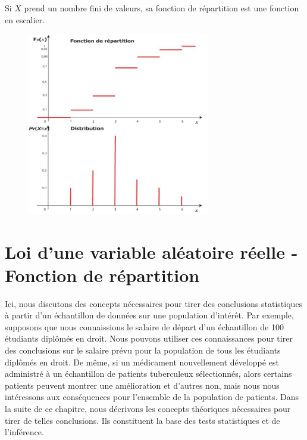 \begin{remark}
Si $X$ prend un nombre fini de
valeurs, sa fonction de répartition
est une fonction en escalier.
\begin{figure}[h]
\centering
\includegraphics[width=8cm]{content/figureremarque1.PNG}
\end{figure}
\end{remark}






































\iffalse
\section{Loi d’une variable aléatoire réelle - Fonction de répartition}\label{chap:1}

Ici, nous discutons des concepts nécessaires pour tirer des conclusions statistiques à partir d'un échantillon de
données sur une population d'intérêt. Par exemple, supposons que nous connaissions le salaire de départ d'un
échantillon de 100 étudiants diplômés en droit. Nous pouvons utiliser ces connaissances pour tirer des conclusions
sur le salaire prévu pour la population de tous les étudiants diplômés en droit. De même, si un médicament nouvellement
développé est administré à un échantillon de patients tuberculeux sélectionnés, alors certains patients peuvent montrer
une amélioration et d'autres non, mais nous nous intéressons aux conséquences pour l'ensemble de la population de
patients. Dans la suite de ce chapitre, nous décrivons les concepts théoriques nécessaires pour tirer de telles
conclusions. Ils constituent la base des tests statistiques et de l'inférence.


